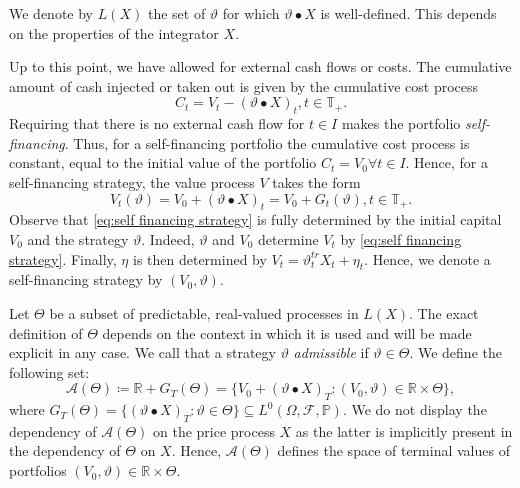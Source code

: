 \documentclass[11pt,a4paper,twoside,openany]{report}
\numberwithin{equation}{section}
\theoremstyle{plain} %
\theoremstyle{definition} %
\theoremstyle{remark} %
\begin{document}
We denote by \(L(X)\) the set of \(\vartheta\) for which \(\vartheta\bullet X\) is well-defined. This depends on the properties of the integrator \(X\).


Up to this point, we have allowed for external cash flows or costs. The cumulative amount of cash injected or taken out is given by the cumulative cost process 
\begin{equation*}
    C_t = V_t - (\vartheta \bullet X)_t, t\in\mathbb{T}_+. 
\end{equation*}
Requiring that there is no external cash flow for \(t\in I\) makes the portfolio \textit{self-financing}. Thus, for a self-financing portfolio the cumulative cost process is constant, equal to the initial value of the  portfolio \(C_t=V_0\forall t\in I\). Hence, for a self-financing strategy, the value process \(V\) takes the form
\begin{equation}\label{eq:self financing strategy}
    V_t(\vartheta) = V_0 + (\vartheta\bullet X)_t=V_0+G_t(\vartheta), t\in\mathbb{T}_+. 
\end{equation}
Observe that \eqref{eq:self financing strategy} is fully determined by the initial capital \(V_0\) and the strategy \(\vartheta\). Indeed, \(\vartheta\) and \(V_0\) determine \(V_t\) by  \eqref{eq:self financing strategy}. Finally, \(\eta\) is then determined by \(V_t = \vartheta_t^{tr}X_t+\eta_t\). Hence, we denote a self-financing strategy by \((V_0,\vartheta)\).


Let \(\Theta\) be a subset of predictable, real-valued processes in \(L(X)\). 
The exact definition of \(\Theta\) depends on the context in which it is used and will be made explicit in any case.
We call that a strategy \(\vartheta\) \textit{admissible} if \(\vartheta\in\Theta\). 
We define the following set:
\begin{equation*}
    \mathcal{A}(\Theta)\coloneqq \mathbb{R}+G_T(\Theta)=\{V_0+(\vartheta \bullet X)_T:(V_0,\vartheta)\in\mathbb{R}\times \Theta\},
\end{equation*}
where \(G_T(\Theta)=\{(\vartheta \bullet X)_T:\vartheta\in \Theta\}\subseteq L^0(\Omega,\mathcal{F},\mathbb{P})\). We do not display the dependency of \(\mathcal{A}(\Theta)\) on the price process \(X\) as the latter is implicitly present in the dependency of \(\Theta\) on \(X\).
Hence, \(\mathcal{A}(\Theta)\) defines the space of terminal values of portfolios \((V_0,\vartheta)\in\mathbb{R}\times \Theta\). 
\end{document}
